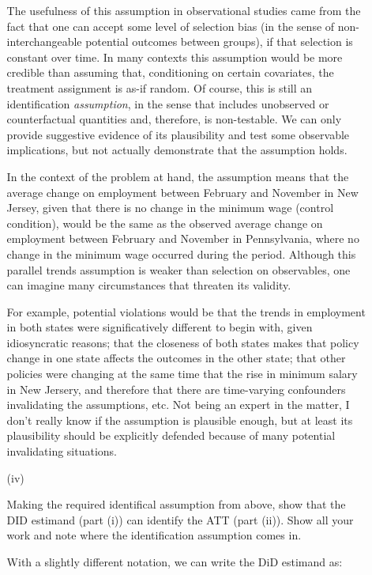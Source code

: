 \documentclass[
  12pt,
  letterpaper,
  DIV=11,
  numbers=noendperiod]{scrartcl}
\newcommand{\1}[1]{\mathds{1}\left[#1\right]}
\begin{document}
\begin{enumerate}
\begin{enumerate}
The usefulness of this assumption in observational studies came from the
fact that one can accept some level of selection bias (in the sense of
non-interchangeable potential outcomes between groups), if that
selection is constant over time. In many contexts this assumption would
be more credible than assuming that, conditioning on certain covariates,
the treatment assignment is as-if random. Of course, this is still an
identification \textit{assumption}, in the sense that includes
unobserved or counterfactual quantities and, therefore, is non-testable.
We can only provide suggestive evidence of its plausibility and test
some observable implications, but not actually demonstrate that the
assumption holds.

In the context of the problem at hand, the assumption means that the
average change on employment between February and November in New
Jersey, given that there is no change in the minimum wage (control
condition), would be the same as the observed average change on
employment between February and November in Pennsylvania, where no
change in the minimum wage occurred during the period. Although this
parallel trends assumption is weaker than selection on observables, one
can imagine many circumstances that threaten its validity.

For example, potential violations would be that the trends in employment
in both states were significatively different to begin with, given
idiosyncratic reasons; that the closeness of both states makes that
policy change in one state affects the outcomes in the other state; that
other policies were changing at the same time that the rise in minimum
salary in New Jersery, and therefore that there are time-varying
confounders invalidating the assumptions, etc. Not being an expert in
the matter, I don't really know if the assumption is plausible enough,
but at least its plausibility should be explicitly defended because of
many potential invalidating situations.

\item[(iv)]

Making the required identifical assumption from above, show that the DID
estimand (part (i)) can identify the ATT (part (ii)). Show all your work
and note where the identification assumption comes in.

With a slightly different notation, we can write the DiD estimand as:


\end{enumerate}
\end{enumerate}
\end{document}
